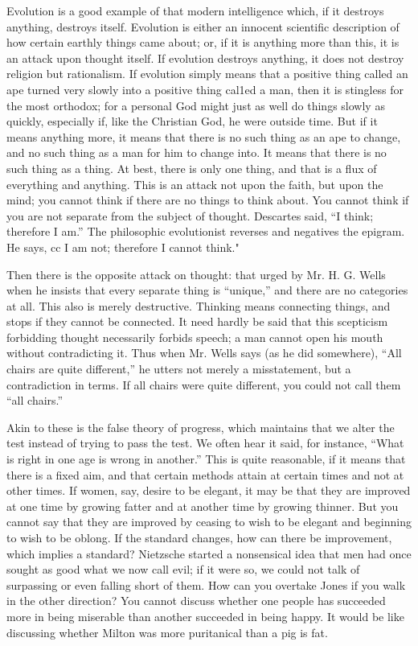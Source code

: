 \documentclass{book}
\begin{document}
Evolution is a good example of that modern intelligence which, if it destroys anything, destroys itself. Evolution is either an innocent scientific description of how certain earthly things came about; or, if it is anything more than this, it is an attack upon thought itself. If evolution destroys anything, it does not destroy religion but rationalism. If evolution simply means that a positive thing called an ape turned very slowly into a positive thing cal1ed a man, then it is stingless for the most orthodox; for a personal God might just as well do things slowly as quickly, especially if, like the Christian God, he were outside time. But if it means anything more, it means that there is no such thing as an ape to change, and no such thing as a man for him to change into. It means that there is no such thing as a thing. At best, there is only one thing, and that is a flux of everything and anything. This is an attack not upon the faith, but upon the mind; you cannot think if there are no things to think about. You cannot think if you are not separate from the subject of thought. Descartes said, “I think; therefore I am.” The philosophic evolutionist reverses and negatives the epigram. He says, cc I am not; therefore I cannot think."

Then there is the opposite attack on thought: that urged by Mr. H. G. Wells when he insists that every separate thing is “unique,” and there are no categories at all. This also is merely destructive. Thinking means connecting things, and stops if they cannot be connected. It need hardly be said that this scepticism forbidding thought necessarily forbids speech; a man cannot open his mouth without contradicting it. Thus when Mr. Wells says (as he did somewhere), “All chairs are quite different,” he utters not merely a misstatement, but a contradiction in terms. If all chairs were quite different, you could not call them “all chairs.”

Akin to these is the false theory of progress, which maintains that we alter the test instead of trying to pass the test. We often hear it said, for instance, “What is right in one age is wrong in another.” This is quite reasonable, if it means that there is a fixed aim, and that certain methods attain at certain times and not at other times. If women, say, desire to be elegant, it may be that they are improved at one time by growing fatter and at another time by growing thinner. But you cannot say that they are improved by ceasing to wish to be elegant and beginning to wish to be oblong. If the standard changes, how can there be improvement, which implies a standard? Nietzsche started a nonsensical idea that men had once sought as good what we now call evil; if it were so, we could not talk of surpassing or even falling short of them. How can you overtake Jones if you walk in the other direction? You cannot discuss whether one people has succeeded more in being miserable than another succeeded in being happy. It would be like discussing whether Milton was more puritanical than a pig is fat.
\end{document}
